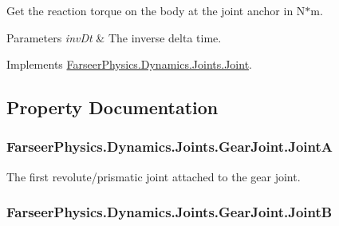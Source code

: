 Get the reaction torque on the body at the joint anchor in N$\ast$m. 


\begin{DoxyParams}{Parameters}
{\em inv\+Dt} & The inverse delta time.\\
\hline
\end{DoxyParams}


Implements \hyperlink{class_farseer_physics_1_1_dynamics_1_1_joints_1_1_joint_a21899d3bdf15c22ef4dc288ed2082cbc}{Farseer\+Physics.\+Dynamics.\+Joints.\+Joint}.



\subsection{Property Documentation}
\hypertarget{class_farseer_physics_1_1_dynamics_1_1_joints_1_1_gear_joint_a5b378a26f47bed9789329263178fbe40}{
\subsubsection[{Joint\+A}]{ Farseer\+Physics.\+Dynamics.\+Joints.\+Gear\+Joint.\+Joint\+A\hspace{0.3cm}{\ttfamily [get]}}}\label{class_farseer_physics_1_1_dynamics_1_1_joints_1_1_gear_joint_a5b378a26f47bed9789329263178fbe40}


The first revolute/prismatic joint attached to the gear joint. 

\hypertarget{class_farseer_physics_1_1_dynamics_1_1_joints_1_1_gear_joint_aab93ee869773d8b4ad51d4e121b8ad83}{
\subsubsection[{Joint\+B}]{ Farseer\+Physics.\+Dynamics.\+Joints.\+Gear\+Joint.\+Joint\+B\hspace{0.3cm}{\ttfamily [get]}}}\label{class_farseer_physics_1_1_dynamics_1_1_joints_1_1_gear_joint_aab93ee869773d8b4ad51d4e121b8ad83}


